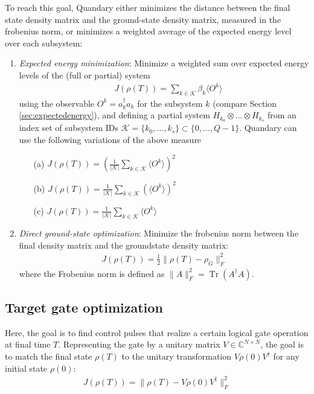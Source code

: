 \documentclass[letterpaper]{article}
\DeclareMathOperator{\Tr}{Tr}
\newcommand{\C}{\mathds{C}}
\begin{document}
To reach this goal, Quandary either minimizes the distance between the final state
density matrix and the ground-state density matrix, measured in the frobenius
norm, or minimizes a weighted average of the expected energy level over each subsystem:
\begin{enumerate}
  \item \textit{Expected energy minimization}: Minimize a weighted sum over
    expected energy levels of the (full or partial) system
    \begin{align}
       \quad J(\rho(T)) = \sum_{k\in \mathcal{K}} \beta_k \langle O^k \rangle 
    \end{align}
    using the observable $O^k = a_k^\dag a_k$ for the subsystem $k$
    (compare Section \ref{sec:expectedenergy}), and defining a partial system
    $H_{k_0}\otimes \dots \otimes H_{k_s}$ from an index set of
    subsystem IDs $\mathcal{K}=\{k_0,\dots,k_s\}\subset
    \{0,\dots,Q-1\}$. Quandary can use the following variations of the
    above measure
    \begin{enumerate}
      \item[(a)] $J(\rho(T)) =
        \left(\frac{1}{|\mathcal{K}|}\sum_{k\in\mathcal{K}}\langle O^k \rangle
        \right)^2$
      \item[(b)] $J(\rho(T)) =
        \frac{1}{|\mathcal{K}|}\sum_{k\in\mathcal{K}}\left(\langle O^k \rangle
        \right)^2 $
      \item[(c)] $J(\rho(T)) =
        \frac{1}{|\mathcal{K}|}\sum_{k\in\mathcal{K}}\langle O^k \rangle$
    \end{enumerate}
  \item \textit{Direct ground-state optimization}: Minimize the frobenius norm
    between the final density matrix and the groundstate density matrix:
    \begin{align}\label{eq:ground-state-obj}
      J(\rho(T)) = \frac 12 \| \rho(T) - \rho_G \|^2_F 
    \end{align}
    where the Frobenius norm is defined as $\|A\|^2_F = \Tr(A^{\dagger}A)$.
\end{enumerate}

\subsection{Target gate optimization}

Here, the goal is to find control pulses that realize a certain logical gate
operation at final time $T$. Representing the gate by a unitary matrix $V\in
\C^{N\times N}$, the goal is to match the final state $\rho(T)$ to the unitary
transformation $V\rho(0)V^{\dagger}$ for any initial state $\rho(0)$:
\begin{align}
  J(\rho(T)) = \| \rho(T) - V\rho(0)V^{\dagger} \|^2_F 
\end{align} 
\end{document}
